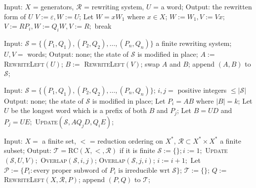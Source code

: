 \documentclass[10pt,a4paper,reqno]{amsart}
\begin{document}
\bigskip

\begin{algorithmic}[1]
    \State Input: $X$ = generators, $\mathcal{R}$ = rewriting system, $U$ = a word;
    \State Output: the rewritten form of $U$
    \State $V:= \varepsilon, W := U$;
    \State Let $W = xW_1$ where $x\in X$; $W:= W_1, V:= Vx;$
    \State $V:= RP_i, W := Q_i W, V:= R;$
    \State break
    \EndIf
    \EndFor
    \EndWhile
    \EndProcedure
\end{algorithmic}

\bigskip

\begin{algorithmic}[1]
    \State Input: $\mathcal{S} = \{(P_1,Q_1), (P_2,Q_2), \dots,(P_n,Q_n)\}$ a finite rewriting system; $U,V = $ words;
    \State Output: none; the state of $\mathcal{S}$ is modified in place;
    \State $A :=$ \textsc{RewriteLeft}$(U)$;
    \State $B :=$ \textsc{RewriteLeft}$(V)$;
    \State swap $A$ and $B$;
    \EndIf
    \State append $(A,B)$ to $\mathcal{S}$;
    \EndIf
    \EndProcedure
\end{algorithmic}

\bigskip

\begin{algorithmic}[1]
    \State Input: $\mathcal{S} = \{(P_1,Q_1), (P_2,Q_2), \dots,(P_n,Q_n)\}$; $i,j = $ positive integers $\le |\mathcal{S}|$
    \State Output: none; the state of $\mathcal{S}$ is modified in place;
    \State Let $P_i = AB$ where $|B| = k$;
    \State Let $U$ be the longest word which is a prefix of both $B$ and $P_j$;
    \State Let $B = UD$ and $P_j = UE;$
    \State \textsc{Update}$(\mathcal{S}, AQ_jD, Q_iE)$;
    \EndIf
    \EndFor
    \EndProcedure
\end{algorithmic}

\bigskip

\begin{algorithmic}[1]
    \State Input:
    \State $X=$ a finite set, $<$ = reduction ordering on $X^*$, $\mathcal{R} \subset X^*\times X^*$ a finite subset;
    \State Output: $\mathcal{T} = \mathrm{RC}(X, <, \mathcal{R})$ if it is finite
    \State
    \State $\mathcal{S} := \{\};i:=1;$
    \State \textsc{Update}$(\mathcal{S},U,V);$
    \EndFor
    \State \textsc{Overlap}$(\mathcal{S}, i,j)$;
    \State \textsc{Overlap}$(\mathcal{S}, j,i)$;
    \EndIf
    \EndFor
    \State $i := i+1;$
    \EndWhile
    \State Let $\mathcal{P} := \{P_i : \text{every proper subword of } P_i \text{ is irreducible wrt } \mathcal{S}\}$;
    \State $\mathcal{T} := \{\}$;
    \State $Q :=$ \textsc{RewriteLeft}$(X, \mathcal{R}, P)$;
    \State append $(P,Q)$ to $\mathcal{T}$;
    \EndFor
    \EndProcedure
\end{algorithmic}
\end{document}
